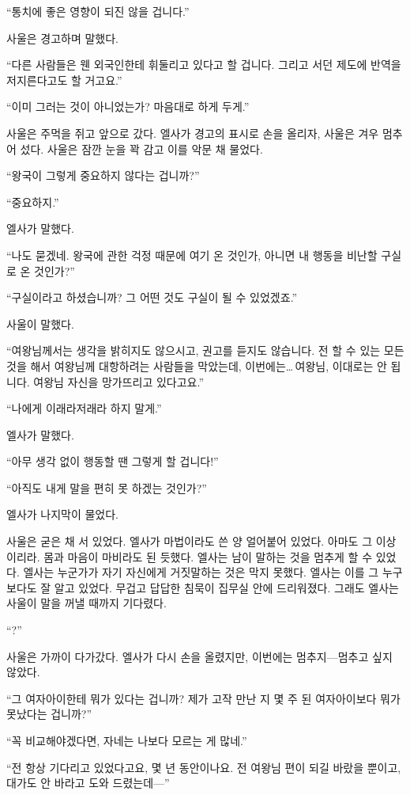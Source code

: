 ``통치에 좋은 영향이 되진 않을 겁니다.''

사울은 경고하며 말했다.

``다른 사람들은 웬 외국인한테 휘둘리고 있다고 할 겁니다. 그리고 서던 제도에 반역을 저지른다고도 할 거고요.''

``이미 그러는 것이 아니었는가? 마음대로 하게 두게.''

사울은 주먹을 쥐고 앞으로 갔다. 엘사가 경고의 표시로 손을 올리자, 사울은 겨우 멈추어 섰다. 사울은 잠깐 눈을 꽉 감고 이를 악문 채 물었다.

``왕국이 그렇게 중요하지 않다는 겁니까?''

``중요하지.''

엘사가 말했다.

``나도 묻겠네. 왕국에 관한 걱정 때문에 여기 온 것인가, 아니면 내 행동을 비난할 구실로 온 것인가?''

``구실이라고 하셨습니까? 그 어떤 것도 구실이 될 수 있었겠죠.''

사울이 말했다.

``여왕님께서는 생각을 밝히지도 않으시고, 권고를 듣지도 않습니다. 전 할 수 있는 모든 것을 해서 여왕님께 대항하려는 사람들을 막았는데, 이번에는\ldots\,여왕님, 이대로는 안 됩니다. 여왕님 자신을 망가뜨리고 있다고요.''

``나에게 이래라저래라 하지 말게.''

엘사가 말했다.

``아무 생각 없이 행동할 땐 그렇게 할 겁니다!''

``아직도 내게 말을 편히 못 하겠는 것인가?''

엘사가 나지막이 물었다.

사울은 굳은 채 서 있었다. 엘사가 마법이라도 쓴 양 얼어붙어 있었다. 아마도 그 이상이리라. 몸과 마음이 마비라도 된 듯했다. 엘사는 남이 말하는 것을 멈추게 할 수 있었다. 엘사는 누군가가 자기 자신에게 거짓말하는 것은 막지 못했다. 엘사는 이를 그 누구보다도 잘 알고 있었다. 무겁고 답답한 침묵이 집무실 안에 드리워졌다. 그래도 엘사는 사울이 말을 꺼낼 때까지 기다렸다.

``?''

사울은 가까이 다가갔다. 엘사가 다시 손을 올렸지만, 이번에는 멈추지—멈추고 싶지 않았다.

``그 여자아이한테 뭐가 있다는 겁니까? 제가 고작 만난 지 몇 주 된 여자아이보다 뭐가 못났다는 겁니까?''

``꼭 비교해야겠다면, 자네는 나보다 모르는 게 많네.''

``전 항상 기다리고 있었다고요, 몇 년 동안이나요. 전 여왕님 편이 되길 바랐을 뿐이고, 대가도 안 바라고 도와 드렸는데—''

